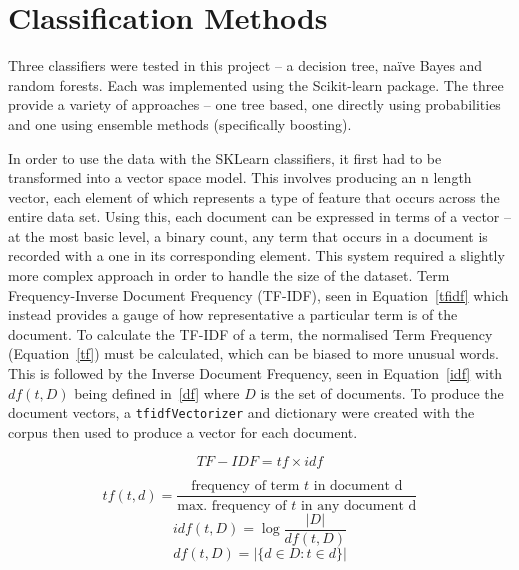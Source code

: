 \documentclass[11pt]{article}
\begin{document}
\section{Classification Methods}

Three classifiers were tested in this project – a decision tree, naïve Bayes and random forests. Each was implemented using the Scikit-learn package. The three provide a variety of approaches – one tree based, one directly using probabilities and one using ensemble methods (specifically boosting).

In order to use the data with the SKLearn classifiers, it first had to be transformed into a vector space model. This involves producing an n length vector, each element of which represents a type of feature that occurs across the entire data set. Using this, each document can be expressed in terms of a vector – at the most basic level, a binary count, any term that occurs in a document is recorded with a one in its corresponding element. This system required a slightly more complex approach in order to handle the size of the dataset. Term Frequency-Inverse Document Frequency (TF-IDF), seen in Equation~\ref{tfidf} which instead provides a gauge of how representative a particular term is of the document.  To calculate the TF-IDF of a term, the normalised Term Frequency (Equation~\ref{tf}) must be calculated, which can be biased to more unusual words. This is followed by the Inverse Document Frequency, seen in Equation~\ref{idf} with $df(t, D)$ being defined in~\ref{df} where $D$ is the set of documents. To produce the document vectors, a \texttt{tfidfVectorizer} and dictionary were created with the corpus then used to produce a vector for each document.

\begin{equation}
\label{tfidf}
TF-IDF = tf \times idf
\end{equation}

\begin{equation}
\label{tf}
tf(t,d) = \frac{\text{frequency of term } t \text{ in document d}}{\text{max. frequency of } t \text{ in any document d}}
\end{equation}
\begin{equation}
\label{idf}
idf(t,D) = \log\frac{\left\vert{D}\right\vert}{df(t, D)}
\end{equation}
\begin{equation}
\label{df}
df(t,D) = \left\vert\{d \in D: t \in d\}\right\vert
\end{equation}
\end{document}
